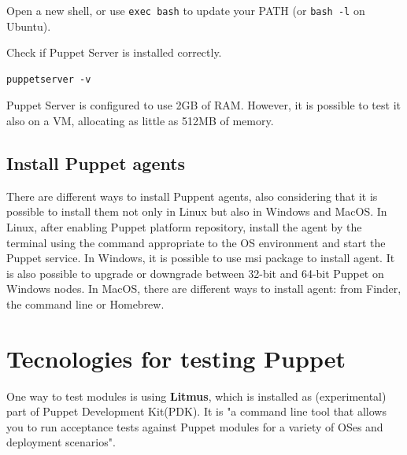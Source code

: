 \documentclass[12pt,a4paper,openright,twoside]{book}
\begin{document}
Open a new shell, or use \texttt{exec bash} to update your PATH (or \texttt{bash -l} on Ubuntu).


Check if Puppet Server is installed correctly.
\begin{lstlisting}
puppetserver -v
\end{lstlisting}


Puppet Server is configured to use 2GB of RAM. However, it is possible to test it also on a VM, allocating as little as 512MB of memory. 

\cite{puppetDocSupportServer}

\subsection{Install Puppet agents}
There are different ways to install Puppent agents, also considering that it is possible to install them not only in Linux but also in Windows and MacOS.
In Linux, after enabling Puppet platform repository, install the agent by the terminal using the command appropriate to the OS environment and start the Puppet service.
In Windows, it is possible to use msi package to install agent. It is also possible to upgrade or downgrade between 32-bit and 64-bit Puppet on Windows nodes.
In MacOS, there are different ways to install agent: from Finder, the command line or Homebrew.

\cite{puppetDocSupportAgents}

\section{Tecnologies for testing Puppet}
One way to test modules is using \textbf{Litmus}, which is installed as (experimental) part of Puppet Development Kit(PDK). It is "a command line tool that allows you to run acceptance tests against Puppet modules for a variety of OSes and deployment scenarios"\cite{puppetLitmus}.
\end{document}
